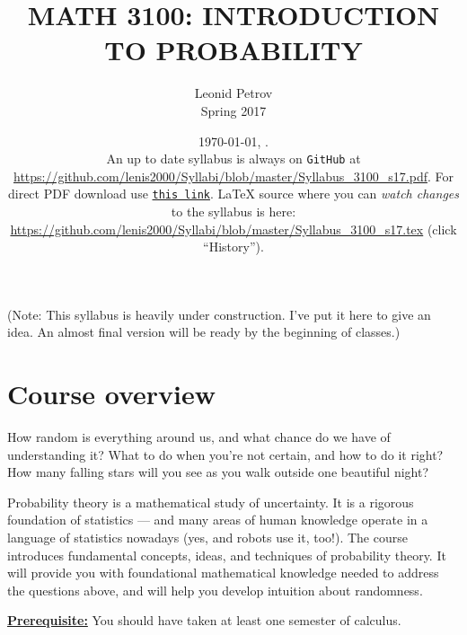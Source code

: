 \documentclass[oneside,11pt]{amsart}
\newcommand{\razdel}[1]{\smallskip\underline{\textbf{#1:}}\smallskip}
\newcommand{\note}[1]{{\Large\sf{}\color{blue}(#1)}}
\begin{document}
\title[MATH 3100: INTRODUCTION TO PROBABILITY]{MATH 3100: INTRODUCTION TO PROBABILITY}
\author{Leonid Petrov\\Spring 2017}
\date{\today, \currenttime.\\An up to date syllabus is always on \texttt{GitHub} at \url{https://github.com/lenis2000/Syllabi/blob/master/Syllabus_3100_s17.pdf}. For direct PDF download use \href{https://github.com/lenis2000/Syllabi/raw/master/Syllabus_3100_s17.pdf}{\texttt{this link}}.
\LaTeX{} source where you can \textit{watch changes} to the syllabus is here: \url{https://github.com/lenis2000/Syllabi/blob/master/Syllabus_3100_s17.tex}
(click ``History'').}
\maketitle

\note{Note: This syllabus is heavily under construction. I've put it here to give an idea. An almost final version will be ready by the 
beginning of classes.}

\section{Course overview}

How random is everything around us, and what chance do we have of understanding it? 
What to do when you're not certain, and how to do it right?
How many falling stars will you see as you walk outside one beautiful night? 

Probability theory is a mathematical study of uncertainty.
It is a rigorous foundation of statistics --- and
many areas of human knowledge operate in a language of statistics nowadays
(yes, and robots use it, too!).
The course introduces fundamental concepts, ideas, and techniques of probability theory.
It  will provide you with foundational mathematical knowledge
needed to address the questions above, and 
will help you develop
intuition about randomness.

\razdel{Prerequisite} You should have taken at least one semester of calculus.
\end{document}
